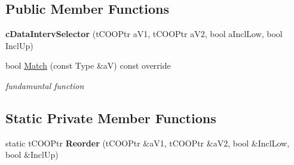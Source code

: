 \subsection*{Public Member Functions}
\begin{DoxyCompactItemize}
\item 
{\bfseries c\+Data\+Interv\+Selector} (t\+C\+O\+O\+Ptr a\+V1, t\+C\+O\+O\+Ptr a\+V2, bool a\+Incl\+Low, bool Incl\+Up)\hypertarget{classMMVII_1_1cDataIntervSelector_ae5e658d8414e0834bfe511fa8dfd9d68}{}\label{classMMVII_1_1cDataIntervSelector_ae5e658d8414e0834bfe511fa8dfd9d68}

\item 
bool \hyperlink{classMMVII_1_1cDataIntervSelector_a4c75e50e2291ce26d44a5d121204a2fc}{Match} (const Type \&aV) const override\hypertarget{classMMVII_1_1cDataIntervSelector_a4c75e50e2291ce26d44a5d121204a2fc}{}\label{classMMVII_1_1cDataIntervSelector_a4c75e50e2291ce26d44a5d121204a2fc}

\begin{DoxyCompactList}\small\item\em fundamuntal function \end{DoxyCompactList}\end{DoxyCompactItemize}
\subsection*{Static Private Member Functions}
\begin{DoxyCompactItemize}
\item 
static t\+C\+O\+O\+Ptr {\bfseries Reorder} (t\+C\+O\+O\+Ptr \&a\+V1, t\+C\+O\+O\+Ptr \&a\+V2, bool \&Incl\+Low, bool \&Incl\+Up)\hypertarget{classMMVII_1_1cDataIntervSelector_acff4d14438b64edefff2049acf135c62}{}\label{classMMVII_1_1cDataIntervSelector_acff4d14438b64edefff2049acf135c62}

\end{DoxyCompactItemize}

